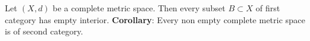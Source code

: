 \documentclass[12pt]{article}
\begin{document}
Let $(X,d)$ be a complete metric space. Then every subset
$B\subset X$ of first category has empty interior.
\newline
\newline
\textbf{Corollary}: Every non empty complete metric space is of second category.
\end{document}
